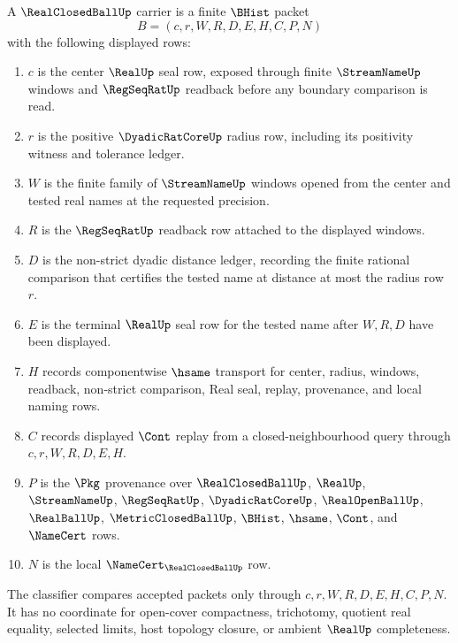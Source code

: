 \begin{definition}
\label{def:real-closed-ball-carrier}
A $\RealClosedBallUp$ carrier is a finite $\BHist$ packet
$$
B=(c,r,W,R,D,E,H,C,P,N)
$$
with the following displayed rows:
\begin{enumerate}
\item $c$ is the center $\RealUp$ seal row, exposed through finite $\StreamNameUp$ windows and $\RegSeqRatUp$ readback before any boundary comparison is read.
\item $r$ is the positive $\DyadicRatCoreUp$ radius row, including its positivity witness and tolerance ledger.
\item $W$ is the finite family of $\StreamNameUp$ windows opened from the center and tested real names at the requested precision.
\item $R$ is the $\RegSeqRatUp$ readback row attached to the displayed windows.
\item $D$ is the non-strict dyadic distance ledger, recording the finite rational comparison that certifies the tested name at distance at most the radius row $r$.
\item $E$ is the terminal $\RealUp$ seal row for the tested name after $W,R,D$ have been displayed.
\item $H$ records componentwise $\hsame$ transport for center, radius, windows, readback, non-strict comparison, Real seal, replay, provenance, and local naming rows.
\item $C$ records displayed $\Cont$ replay from a closed-neighbourhood query through $c,r,W,R,D,E,H$.
\item $P$ is the $\Pkg$ provenance over $\RealClosedBallUp$, $\RealUp$, $\StreamNameUp$, $\RegSeqRatUp$, $\DyadicRatCoreUp$, $\RealOpenBallUp$, $\RealBallUp$, $\MetricClosedBallUp$, $\BHist$, $\hsame$, $\Cont$, and $\NameCert$ rows.
\item $N$ is the local $\NameCert_{\RealClosedBallUp}$ row.
\end{enumerate}
The classifier compares accepted packets only through $c,r,W,R,D,E,H,C,P,N$. It has no coordinate for open-cover compactness, trichotomy, quotient real equality, selected limits, host topology closure, or ambient $\RealUp$ completeness.
\end{definition}

